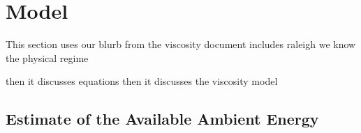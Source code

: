 \section{Model}

This section uses our blurb from the viscosity document
includes raleigh 
we know the physical regime

then it discusses equations
then it discusses the viscosity model



\subsection{Estimate of the Available Ambient Energy}

